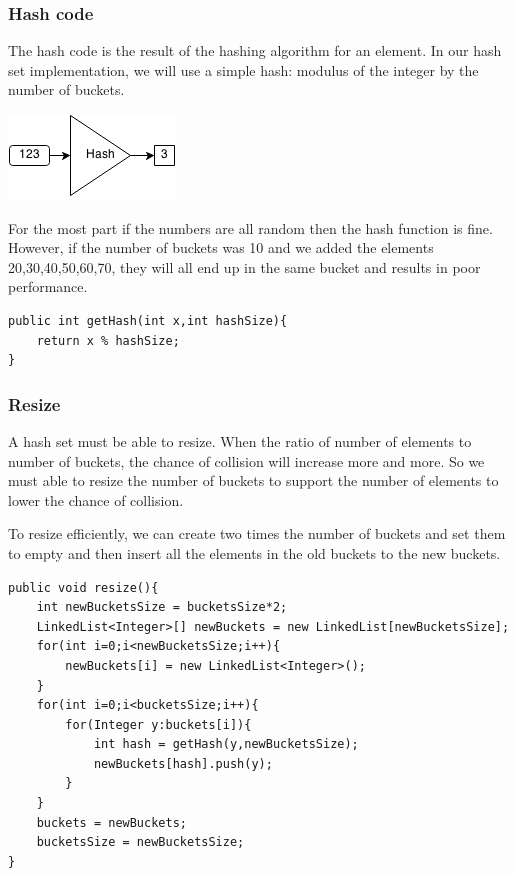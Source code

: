 \documentclass[11pt,oneside]{book}
\makeatletter
\def\maxwidth#1{\ifdim\Gin@nat@width>#1 #1\else\Gin@nat@width\fi}
\makeatother
\begin{document}
\subsubsection{Hash code}

The hash code is the result of the hashing algorithm for an element. In our hash set implementation, we will use a simple hash: modulus of the integer by the number of buckets.

\vspace{5px}\includegraphics[width=\maxwidth{\textwidth}]{hashcode.png}

For the most part if the numbers are all random then the hash function is fine. However, if the number of buckets was 10 and we added the elements 20,30,40,50,60,70, they will all end up in the same bucket and results in poor performance.

\begin{lstlisting}
public int getHash(int x,int hashSize){
    return x % hashSize;
}
\end{lstlisting}

\subsubsection{Resize}

A hash set must be able to resize. When the ratio of number of elements to number of buckets, the chance of collision will increase more and more. So we must able to resize the number of buckets to support the number of elements to lower the chance of collision.

To resize efficiently, we can create two times the number of buckets and set them to empty and then insert all the elements in the old buckets to the new buckets.

\begin{lstlisting}
public void resize(){
    int newBucketsSize = bucketsSize*2;
    LinkedList<Integer>[] newBuckets = new LinkedList[newBucketsSize];
    for(int i=0;i<newBucketsSize;i++){
        newBuckets[i] = new LinkedList<Integer>();
    }
    for(int i=0;i<bucketsSize;i++){
        for(Integer y:buckets[i]){
            int hash = getHash(y,newBucketsSize);
            newBuckets[hash].push(y);
        }
    }
    buckets = newBuckets;
    bucketsSize = newBucketsSize;
}
\end{lstlisting}
\end{document}
